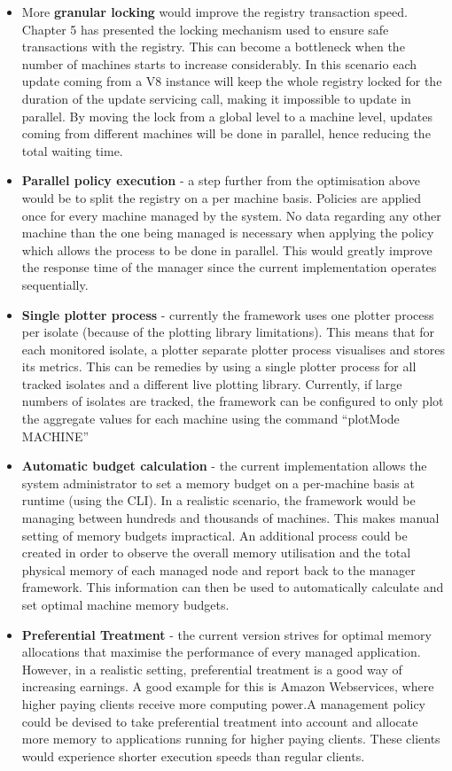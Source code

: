 \documentclass{l4proj}
\begin{document}
\begin{itemize}
\item More \textbf{granular locking} would improve the registry transaction speed. Chapter 5 has presented the locking mechanism used to ensure safe transactions with the registry. This can become a bottleneck when the number of machines starts to increase considerably. In this scenario each update coming from a V8 instance will keep the whole registry locked for the duration of the update servicing call, making it impossible to update in parallel. By moving the lock from a global level to a machine level, updates coming from different machines will be done in parallel, hence reducing the total waiting time.

\item \textbf{Parallel policy execution} - a step further from the optimisation above would be to split the registry on a per machine basis. Policies are applied once for every machine managed by the system. No data regarding any other machine than the one being managed is necessary when applying the policy which allows the process to be done in parallel. This would greatly improve the response time of the manager since the current implementation operates sequentially.

\item \textbf{Single plotter process} - currently the framework uses one plotter process per isolate (because of the plotting library limitations). This means that for each monitored isolate, a plotter separate plotter process visualises and stores its metrics. This can be remedies by using a single plotter process for all tracked isolates and a different live plotting library. Currently, if large numbers of isolates are tracked, the framework can be configured to only plot the aggregate values for each machine using the command ``plotMode MACHINE''

\item \textbf{Automatic budget calculation} - the current implementation allows the system administrator to set a memory budget on a per-machine basis at runtime (using the CLI). In a realistic scenario, the framework would be managing between hundreds and thousands of machines. This makes manual setting of memory budgets impractical. An additional process could be created in order to observe the overall memory utilisation and the total physical memory of each managed node and report back to the manager framework. This information can then be used to automatically calculate and set optimal machine memory budgets.

\item \textbf{Preferential Treatment} - the current version strives for optimal memory allocations that maximise the performance of every managed application. However, in a realistic setting, preferential treatment is a good way of increasing earnings. A good example for this is Amazon Webservices, where higher paying clients receive more computing power.A management policy could be devised to take preferential treatment into account and allocate more memory to applications running for higher paying clients. These clients would experience shorter execution speeds than regular clients.
\end{itemize}
\end{document}

